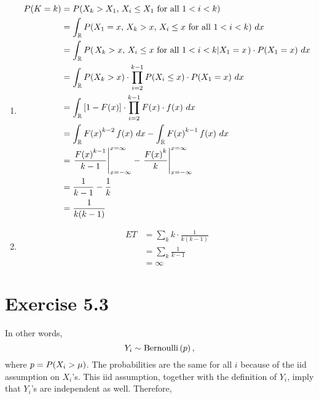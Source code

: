 \documentclass[12pt,letterpaper,reqno]{amsart}
\numberwithin{equation}{subsection}
\begin{document}
\begin{enumerate}[label=(\alph*),leftmargin=*]
    \item
    
    \begin{align*}
        \fun{P}{K = k} &= \fun{P}{\mbox{$X_{k} > X_1$, $X_i \leq X_1$ for all $1 < i < k$}} \\
        &= \myint{\fun{P}{\mbox{$X_1 = x$, $X_{k} > x$, $X_i \leq x$ for all $1 < i < k$}}}{x}{\D{R}}{} \\
        &= \myint{\fun{P}{\conditbar{\mbox{$X_{k} > x$, $X_i \leq x$ for all $1 < i < k$}}{X_1 = x}} \cdot \fun{P}{X_1 = x}}{x}{\D{R}}{} \\
        &= \myint{\fun{P}{X_k > x} \cdot \prod_{i=2}^{k-1} \fun{P}{X_i \leq x} \cdot \fun{P}{X_1 = x}}{x}{\D{R}}{} \\
        &= \myint{ \left[ 1 - \fun{F}{x}\right] \cdot \prod_{i=2}^{k-1} \fun{F}{x} \cdot \fun{f}{x}}{x}{\D{R}}{} \\
        &= \myint{\fun{F}{x}^{k-2} \fun{f}{x}}{x}{\D{R}}{} - \myint{\fun{F}{x}^{k-1} \fun{f}{x}}{x}{\D{R}}{} \\
        &= \left. \frac{\fun{F}{x}^{k-1}}{k-1} \right\vert_{x=-\infty}^{x = \infty} - \left. \frac{\fun{F}{x}^{k}}{k} \right\vert_{x=-\infty}^{x = \infty} \\
        &= \frac{1}{k-1} - \frac{1}{k} \\
        &= \frac{1}{k(k-1)}
    \end{align*}
    
    \item
    
    \begin{align*}
        ET &= \sum_{k} k \cdot \frac{1}{k(k-1)} \\
        &= \sum_{k} \frac{1}{k-1} \\
        &= \infty
    \end{align*}
\end{enumerate}

\newpage
\section{Exercise 5.3}

In other words,
\[ Y_i \sim \operatorname{Bernoulli}\left( {p} \right), \]
where $p = {P}\! \left( {X_i > \mu} \right)$. The probabilities are the same for all $i$ because of the iid assumption on $X_i$'s. This iid assumption, together with the definition of $Y_i$, imply that $Y_i$'s are independent as well. Therefore,
\end{document}
